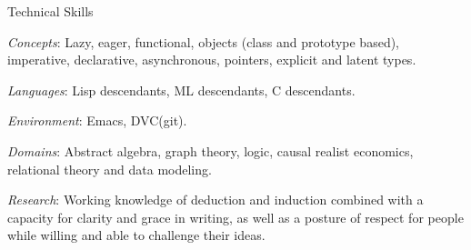 \begin{rubric}{Technical Skills}{


  \entry* \emph{Concepts}: Lazy, eager, functional, objects (class and
prototype based), imperative, declarative, asynchronous, pointers,
explicit and latent types.

  \entry* \emph{Languages}: Lisp descendants, ML descendants, C
descendants.

  \entry* \emph{Environment}: Emacs, DVC(git).

  \entry* \emph{Domains}: Abstract algebra, graph theory, logic,
causal realist economics, relational theory and data modeling.

  \entry* \emph{Research}: Working knowledge of deduction and
induction combined with a capacity for clarity and grace in writing,
as well as a posture of respect for people while willing and able to
challenge their ideas.

}\end{rubric}
